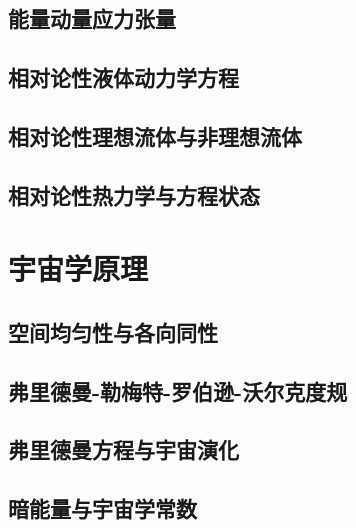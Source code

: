 \documentclass[a4paper]{report}
\begin{document}
\section{能量动量应力张量} 
\section{相对论性液体动力学方程}
\section{相对论性理想流体与非理想流体}
\section{相对论性热力学与方程状态}


\chapter{宇宙学原理}
\section{空间均匀性与各向同性}
\section{弗里德曼-勒梅特-罗伯逊-沃尔克度规}
\section{弗里德曼方程与宇宙演化}
\section{暗能量与宇宙学常数}


%
\end{document}
